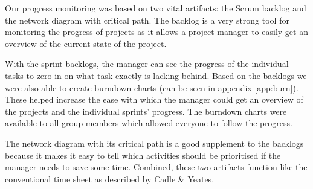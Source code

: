 Our progress monitoring was based on two vital artifacts: the Scrum backlog and the network
diagram with critical path. The backlog is a very strong tool for monitoring the progress
of projects as it allows a project manager to easily get an overview of the current state
of the project.

With the sprint backlogs, the manager can see the progress of the individual tasks to zero 
in on what task exactly is lacking behind. Based on the backlogs we were also able to create 
burndown charts (can be seen in appendix \ref{app:burn}). These helped increase the ease 
with which the manager could get an overview of the projects and the individual sprints' progress. 
The burndown charts were available to all group members which allowed everyone to follow the progress.

The network diagram with its critical path is a good supplement to the backlogs because it
makes it easy to tell which activities should be prioritised if the manager needs to save
some time. Combined, these two artifacts function like the conventional time sheet as
described by Cadle \& Yeates\cite[ch.~11]{caye}.
